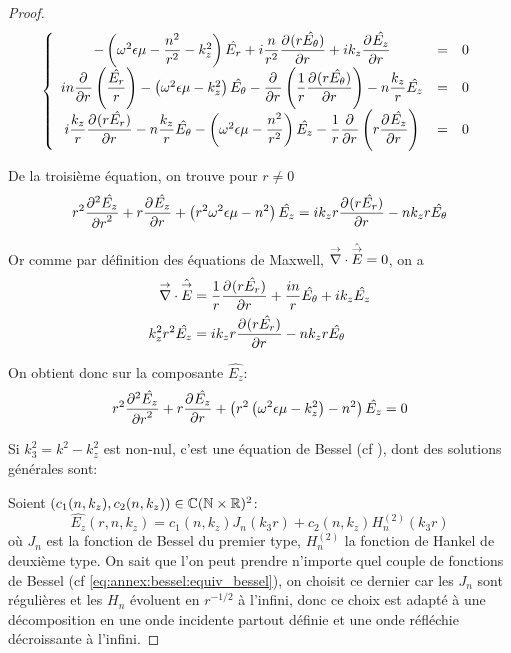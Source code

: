 \begin{proof}
    \begin{equation}
      \left\lbrace
      \begin{array}{ccc}
        -\left(\w^2\eps\mu -\frac{n^2}{r^2}  - k_z^2\right)\hat{E_r}  +i\frac{n}{r^2}\ddr{r}{(r\hat{E_\theta})}  +i k_z\ddr{r}{\hat{E_z}} & = & 0
        \\
        in\ddr{r}{}\left(\frac{\hat{E_r}}{r}\right) -\left(\w^2\eps\mu - k_z^2\right)\hat{E_\theta} - \ddr{r}{}\left(\frac{1}{r}\ddr{r}{(r\hat{E_\theta})}\right)  - n\frac{k_z}{r}\hat{E_z} & = & 0
        \\
        i\frac{k_z}{r}\ddr{r}{(r\hat{E_r})}  - n\frac{k_z}{r}\hat{E_\theta}  -\left(\w^2\eps\mu - \frac{n^2}{r^2} \right)\hat{E_z} - \frac{1}{r}\ddr{r}{}\left(r\ddr{r}{\hat{E_z}}\right) & = & 0
      \end{array}
      \right.
    \end{equation}

    De la troisième  équation, on trouve pour \(r\not=0\)
    \begin{equation}
    r^2 \ddr[2]{r}{\hat{E_z}} + r\ddr{r}{\hat{E_z}} + \left(r^2\w^2\eps\mu - n^2\right)\hat{E_z} =ik_zr\ddr{r}{(r\hat{E_r})} -  nk_zr\hat{E_\theta}
    \end{equation}

    Or comme par définition des équations de Maxwell, \(\vdiv \hat \vE = 0\), on a
    \begin{align}
      \vdiv\hat \vE &= \frac{1}{r}\ddr{r}{(r\hat{E_r})} + \frac{in}{r}\hat{E_\theta} + ik_z\hat{E_z}
      \\
      k_z^2r^2 \hat{E_z} &= ik_zr\ddr{r}{(r\hat{E_r})} - nk_zr\hat{E_\theta}
    \end{align}

    On obtient donc sur la composante \(\hat{E_z}\):
    \begin{equation}
      r^2 \ddr[2]{r}{\hat{E_z}} + r\ddr{r}{\hat{E_z}} + \left(r^2\left(\w^2\eps\mu - k_z^2\right) - n^2\right)\hat{E_z} = 0
    \end{equation}

    Si \(k_3^2 = k^2 - k_z^2\) est non-nul, c'est une équation de Bessel (cf \cite[eq (6.80)]{bowman_introduction_1958}),%
    dont des solutions générales sont: 

    Soient \((c_1(n,k_z),c_2(n,k_z)) \in \CC(\NN\times\RR)^2\):
    \begin{equation}
      \hat{E_z}(r,n,k_z) = c_1(n,k_z) J_n\left(k_3r\right) + c_2(n,k_z) H_n^{(2)}\left(k_3r\right)
    \end{equation}
    où \(J_n\) est la fonction de Bessel du premier type, \(H_n^{(2)}\) la fonction de Hankel de deuxième type.
    On sait que l'on peut prendre n'importe quel couple de fonctions de Bessel (cf \eqref{eq:annex:bessel:equiv_bessel}), on choisit ce dernier car les \(J_n\) sont régulières et les \(H_n\) évoluent en \(r^{-1 \slash 2}\) à l'infini, donc ce choix est adapté à une décomposition en une onde incidente partout définie et une onde réfléchie décroissante à l'infini.


\end{proof}
